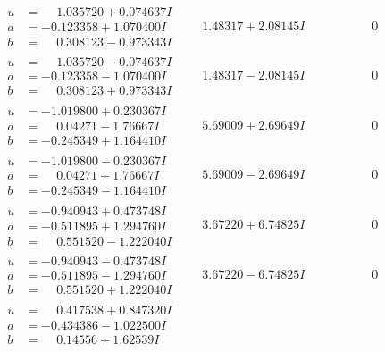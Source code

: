 \documentclass[1p]{elsarticle_modified}
\theoremstyle{definition}
\begin{document}
$$\begin{array}{c|c|c}
\begin{aligned}
u &= \phantom{-}1.035720 + 0.074637 I \\
a &= -0.123358 + 1.070400 I \\
b &= \phantom{-}0.308123 - 0.973343 I\end{aligned}
 & \phantom{-}1.48317 + 2.08145 I & \phantom{-0.000000 } 0 \\ \hline\begin{aligned}
u &= \phantom{-}1.035720 - 0.074637 I \\
a &= -0.123358 - 1.070400 I \\
b &= \phantom{-}0.308123 + 0.973343 I\end{aligned}
 & \phantom{-}1.48317 - 2.08145 I & \phantom{-0.000000 } 0 \\ \hline\begin{aligned}
u &= -1.019800 + 0.230367 I \\
a &= \phantom{-}0.04271 - 1.76667 I \\
b &= -0.245349 + 1.164410 I\end{aligned}
 & \phantom{-}5.69009 + 2.69649 I & \phantom{-0.000000 } 0 \\ \hline\begin{aligned}
u &= -1.019800 - 0.230367 I \\
a &= \phantom{-}0.04271 + 1.76667 I \\
b &= -0.245349 - 1.164410 I\end{aligned}
 & \phantom{-}5.69009 - 2.69649 I & \phantom{-0.000000 } 0 \\ \hline\begin{aligned}
u &= -0.940943 + 0.473748 I \\
a &= -0.511895 + 1.294760 I \\
b &= \phantom{-}0.551520 - 1.222040 I\end{aligned}
 & \phantom{-}3.67220 + 6.74825 I & \phantom{-0.000000 } 0 \\ \hline\begin{aligned}
u &= -0.940943 - 0.473748 I \\
a &= -0.511895 - 1.294760 I \\
b &= \phantom{-}0.551520 + 1.222040 I\end{aligned}
 & \phantom{-}3.67220 - 6.74825 I & \phantom{-0.000000 } 0 \\ \hline\begin{aligned}
u &= \phantom{-}0.417538 + 0.847320 I \\
a &= -0.434386 - 1.022500 I \\
b &= \phantom{-}0.14556 + 1.62539 I\end{aligned}

\end{array}$$
\end{document}
